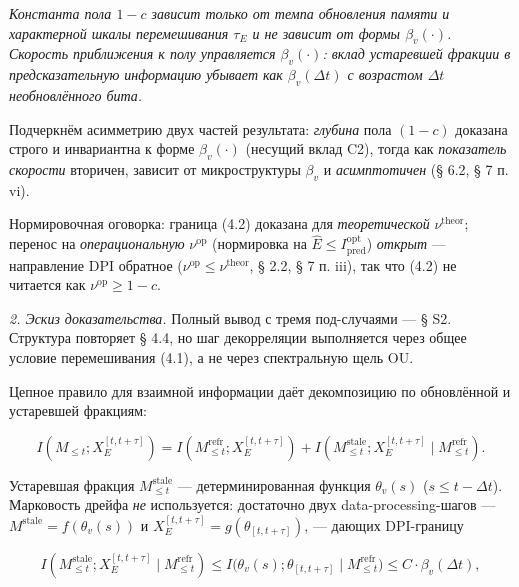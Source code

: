 \documentclass[12pt]{iopart}
\begin{document}
\emph{Константа пола \(1-c\) зависит только от темпа обновления памяти и характерной шкалы перемешивания \(\tau_E\) и не зависит от формы \(\beta_v(\cdot)\). Скорость приближения к полу управляется \(\beta_v(\cdot)\): вклад устаревшей фракции в предсказательную информацию убывает как \(\beta_v(\Delta t)\) с возрастом \(\Delta t\) необновлённого бита.}



Подчеркнём асимметрию двух частей результата: \emph{глубина} пола \((1-c)\) доказана строго и инвариантна к форме \(\beta_v(\cdot)\) (несущий вклад C2), тогда как \emph{показатель скорости} вторичен, зависит от микроструктуры \(\beta_v\) и \emph{асимптотичен} (§ 6.2, § 7 п. vi).



Нормировочная оговорка: граница (4.2) доказана для \emph{теоретической} \(\nu^{\text{theor}}\); перенос на \emph{операциональную} \(\nu^{\text{op}}\) (нормировка на \(\hat E \le I_{\text{pred}}^{\text{opt}}\)) \emph{открыт} --- направление DPI обратное (\(\nu^{\text{op}} \le \nu^{\text{theor}}\), § 2.2, § 7 п. iii), так что (4.2) не читается как \(\nu^{\text{op}} \ge 1-c\).



\emph{2. Эскиз доказательства.} Полный вывод с тремя под-случаями --- § S2. Структура повторяет \cite{Andriishin2026b} § 4.4, но шаг декорреляции выполняется через общее условие перемешивания (4.1), а не через спектральную щель OU.



Цепное правило для взаимной информации даёт декомпозицию по обновлённой и устаревшей фракциям:



\[I(M_{\le t}; X_E^{[t,t+\tau]}) = I(M_{\le t}^{\text{refr}}; X_E^{[t,t+\tau]}) + I(M_{\le t}^{\text{stale}}; X_E^{[t,t+\tau]}\mid M_{\le t}^{\text{refr}}).\]



Устаревшая фракция \(M_{\le t}^{\text{stale}}\) --- детерминированная функция \(\theta_v(s)\) (\(s \le t - \Delta t\)). Марковость дрейфа \emph{не} используется: достаточно двух data-processing-шагов --- \(M^{\text{stale}} = f(\theta_v(s))\) и \(X_E^{[t,t+\tau]} = g(\theta_{[t,t+\tau]})\), --- дающих DPI-границу



\[I(M_{\le t}^{\text{stale}}; X_E^{[t,t+\tau]}\mid M_{\le t}^{\text{refr}}) \le I\big(\theta_v(s); \theta_{[t,t+\tau]}\mid M_{\le t}^{\text{refr}}\big) \le C\cdot\beta_v(\Delta t),\]
\end{document}
